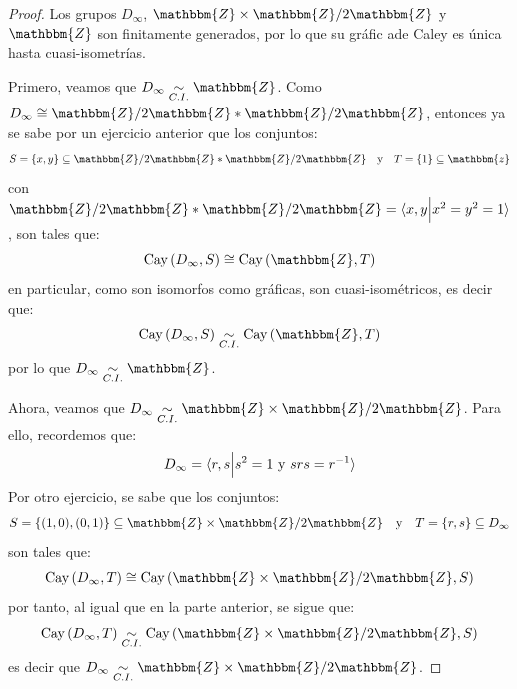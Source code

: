 \documentclass[12pt]{report}
\newcounter{it}
\theoremstyle{largebreak}
\newcommand{\bbm}[1]{\ensuremath{\mathbbm{#1}}}
\newcommand{\Cay}[1]{\ensuremath{\textup{Cay}\left(#1\right)}}
\newcommand{\gen}[1]{\ensuremath{\langle#1\rangle}}
\newcommand{\qisom}{\ensuremath{\underset{C.I.}{\sim}}}
\begin{document}
    \begin{proof}
        Los grupos $D_\infty$, $\bbm{Z}\times\bbm{Z}/2\bbm{Z}$ y $\bbm{Z}$ son finitamente generados, por lo que su gráfic ade Caley es única hasta cuasi-isometrías.

        Primero, veamos que $D_\infty\qisom\bbm{Z}$. Como $D_\infty\cong\bbm{Z}/2\bbm{Z}*\bbm{Z}/2\bbm{Z}$, entonces ya se sabe por un ejercicio anterior que los conjuntos:
        \begin{equation*}
            S=\left\{x,y \right\}\subseteq\bbm{Z}/2\bbm{Z}*\bbm{Z}/2\bbm{Z} \quad\textup{y}\quad T=\left\{1\right\}\subseteq\bbm{z}
        \end{equation*}
        con $\bbm{Z}/2\bbm{Z}*\bbm{Z}/2\bbm{Z}=\gen{x,y\Big|x^2=y^2=1}$, son tales que:
        \begin{equation*}
            \Cay{D_\infty,S}\cong\Cay{\bbm{Z},T}
        \end{equation*}
        en particular, como son isomorfos como gráficas, son cuasi-isométricos, es decir que:
        \begin{equation*}
            \Cay{D_\infty,S}\qisom\Cay{\bbm{Z},T}
        \end{equation*}
        por lo que $D_\infty\qisom\bbm{Z}$.

        Ahora, veamos que $D_\infty\qisom\bbm{Z}\times\bbm{Z}/2\bbm{Z}$. Para ello, recordemos que:
        \begin{equation*}
            D_\infty=\gen{r,s\Big|s^2=1\textup{ y }srs=r^{-1}}
        \end{equation*}
        Por otro ejercicio, se sabe que los conjuntos:
        \begin{equation*}
            S=\left\{(1,0),(0,1)\right\}\subseteq\bbm{Z}\times\bbm{Z}/2\bbm{Z}\quad\textup{y}\quad T=\left\{r,s \right\}\subseteq D_\infty
        \end{equation*}
        son tales que:
        \begin{equation*}
            \Cay{D_\infty,T}\cong\Cay{\bbm{Z}\times\bbm{Z}/2\bbm{Z},S}
        \end{equation*}
        por tanto, al igual que en la parte anterior, se sigue que:
        \begin{equation*}
            \Cay{D_\infty,T}\qisom\Cay{\bbm{Z}\times\bbm{Z}/2\bbm{Z},S}
        \end{equation*}
        es decir que $D_\infty\qisom\bbm{Z}\times\bbm{Z}/2\bbm{Z}$.
    \end{proof}
\end{document}
